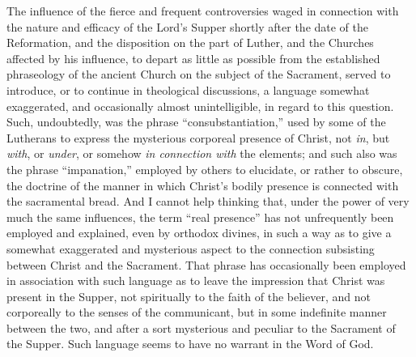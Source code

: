 \documentclass[english,]{book}
\begin{document}
The influence of the fierce and frequent controversies waged in connection with the nature and efficacy of the Lord's Supper shortly after the date of the Reformation, and the disposition on the part of Luther, and the Churches affected by his influence, to depart as little as possible from the established phraseology of the ancient Church on the subject of the Sacrament, served to introduce, or to continue in theological discussions, a language somewhat exaggerated, and occasionally almost unintelligible, in regard to this question. Such, undoubtedly, was the phrase ``consubstantiation,'' used by some of the Lutherans to express the mysterious corporeal presence of Christ, not \emph{in}, but \emph{with}, or \emph{under}, or somehow \emph{in connection with} the elements; and such also was the phrase ``impanation,'' employed by others to elucidate, or rather to obscure, the doctrine of the manner in which Christ's bodily presence is connected with the sacramental bread. And I cannot help thinking that, under the power of very much the same influences, the term ``real presence'' has not unfrequently been employed and explained, even by orthodox divines, in such a way as to give a somewhat exaggerated and mysterious aspect to the connection subsisting between Christ and the Sacrament. That phrase has occasionally been employed in association with such language as to leave the impression that Christ was present in the Supper, not spiritually to the faith of the believer, and not corporeally to the senses of the communicant, but in some indefinite manner between the two, and after a sort mysterious and peculiar to the Sacrament of the Supper. Such language seems to have no warrant in the Word of God.
\end{document}
